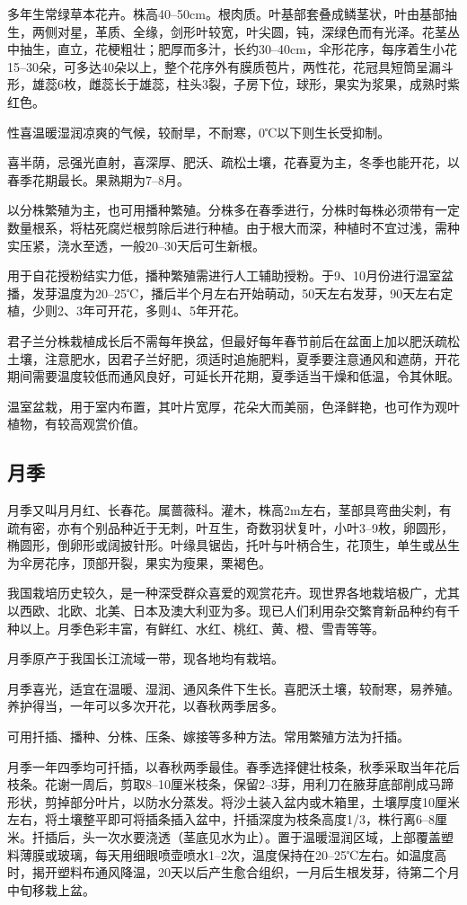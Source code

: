 \documentclass{ctexbook}
\begin{document}
多年生常绿草本花卉。株高40--50cm。根肉质。叶基部套叠成鳞茎状，叶由基部抽生，两侧对星，革质、全缘，剑形叶较宽，叶尖圆，钝，深绿色而有光泽。花茎丛中抽生，直立，花梗粗壮；肥厚而多汁，长约30--40cm，伞形花序，每序着生小花15--30朵，可多达40朵以上，整个花序外有膜质苞片，两性花，花冠具短筒呈漏斗形，雄蕊6枚，雌蕊长于雄蕊，柱头3裂，子房下位，球形，果实为浆果，成熟时紫红色。

性喜温暖湿润凉爽的气候，较耐旱，不耐寒，0℃以下则生长受抑制。

喜半荫，忌强光直射，喜深厚、肥沃、疏松土壤，花春夏为主，冬季也能开花，以春季花期最长。果熟期为7--8月。

以分株繁殖为主，也可用播种繁殖。分株多在春季进行，分株时每株必须带有一定数量根系，将枯死腐烂根剪除后进行种植。由于根大而深，种植时不宜过浅，需种实压紧，浇水至透，一般20--30天后可生新根。

用于自花授粉结实力低，播种繁殖需进行人工辅助授粉。于9、10月份进行温室盆播，发芽温度为20--25℃，播后半个月左右开始萌动，50天左右发芽，90天左右定植，少则2、3年可开花，多则4、5年开花。

君子兰分株栽植成长后不需每年换盆，但最好每年春节前后在盆面上加以肥沃疏松土壤，注意肥水，因君子兰好肥，须适时追施肥料，夏季要注意通风和遮荫，开花期间需要温度较低而通风良好，可延长开花期，夏季适当干燥和低温，令其休眠。

温室盆栽，用于室内布置，其叶片宽厚，花朵大而美丽，色泽鲜艳，也可作为观叶植物，有较高观赏价值。

\subsection{月季}
月季又叫月月红、长春花。属蔷薇科。灌木，株高2m左右，茎部具弯曲尖刺，有疏有密，亦有个别品种近于无刺，叶互生，奇数羽状复叶，小叶3--9枚，卵圆形，椭圆形，倒卵形或阔披针形。叶缘具锯齿，托叶与叶柄合生，花顶生，单生或丛生为伞房花序，顶部开裂，果实为瘦果，栗褐色。

我国栽培历史较久，是一种深受群众喜爱的观赏花卉。现世界各地栽培极广，尤其以西欧、北欧、北美、日本及澳大利亚为多。现已人们利用杂交繁育新品种约有千种以上。月季色彩丰富，有鲜红、水红、桃红、黄、橙、雪青等等。

月季原产于我国长江流域一带，现各地均有栽培。

月季喜光，适宜在温暖、湿润、通风条件下生长。喜肥沃土壤，较耐寒，易养殖。养护得当，一年可以多次开花，以春秋两季居多。

可用扦插、播种、分株、压条、嫁接等多种方法。常用繁殖方法为扦插。

月季一年四季均可扦插，以春秋两季最佳。春季选择健壮枝条，秋季采取当年花后枝条。花谢一周后，剪取8--10厘米枝条，保留2--3芽，用利刀在腋芽底部削成马蹄形状，剪掉部分叶片，以防水分蒸发。将沙土装入盆内或木箱里，土壤厚度10厘米左右，将土壤整平即可将插条插入盆中，扦插深度为枝条高度1/3，株行离6--8厘米。扦插后，头一次水要浇透（茎底见水为止）。置于温暖湿润区域，上部覆盖塑料薄膜或玻璃，每天用细眼喷壶喷水1--2次，温度保持在20--25℃左右。如温度高时，揭开塑料布通风降温，20天以后产生愈合组织，一月后生根发芽，待第二个月中旬移栽上盆。
\end{document}
